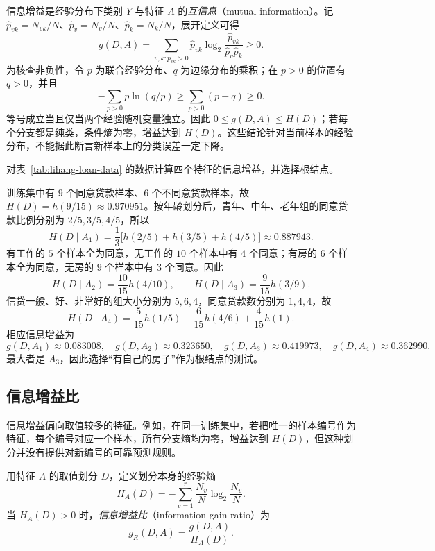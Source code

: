 信息增益是经验分布下类别 $Y$ 与特征 $A$ 的\emph{互信息}（mutual information）。记 $\widehat p_{vk}=N_{vk}/N$、$\widehat p_v=N_v/N$、$\widehat p_k=N_k/N$，展开定义可得
\begin{equation}
  g(D,A)=\sum_{v,k:\widehat p_{vk}>0}\widehat p_{vk}
  \log_2\frac{\widehat p_{vk}}{\widehat p_v\widehat p_k}\geq0.
  \label{eq:lihang-tree-mutual-information}
\end{equation}
为核查非负性，令 $p$ 为联合经验分布、$q$ 为边缘分布的乘积；在 $p>0$ 的位置有 $q>0$，并且
\[
  -\sum_{p>0}p\ln(q/p)\geq\sum_{p>0}(p-q)\geq0.
\]
等号成立当且仅当两个经验随机变量独立。因此 $0\leq g(D,A)\leq H(D)$；若每个分支都是纯类，条件熵为零，增益达到 $H(D)$。这些结论针对当前样本的经验分布，不能据此断言新样本上的分类误差一定下降。

\begin{example}
\label{ex:lihang-loan-gain}
对表~\ref{tab:lihang-loan-data} 的数据计算四个特征的信息增益，并选择根结点。
\end{example}
\begin{solve}
训练集中有 $9$ 个同意贷款样本、$6$ 个不同意贷款样本，故 $H(D)=h(9/15)\approx0.970951$。按年龄划分后，青年、中年、老年组的同意贷款比例分别为 $2/5,3/5,4/5$，所以
\[
  H(D\mid A_1)=\frac13\bigl[h(2/5)+h(3/5)+h(4/5)\bigr]\approx0.887943.
\]
有工作的 $5$ 个样本全为同意，无工作的 $10$ 个样本中有 $4$ 个同意；有房的 $6$ 个样本全为同意，无房的 $9$ 个样本中有 $3$ 个同意。因此
\[
  H(D\mid A_2)=\frac{10}{15}h(4/10),\qquad
  H(D\mid A_3)=\frac9{15}h(3/9).
\]
信贷一般、好、非常好的组大小分别为 $5,6,4$，同意贷款数分别为 $1,4,4$，故
\[
  H(D\mid A_4)=\frac5{15}h(1/5)+\frac6{15}h(4/6)+\frac4{15}h(1).
\]
相应信息增益为
\[
  g(D,A_1)\approx0.083008,\quad g(D,A_2)\approx0.323650,\quad
  g(D,A_3)\approx0.419973,\quad g(D,A_4)\approx0.362990.
\]
最大者是 $A_3$，因此选择“有自己的房子”作为根结点的测试。
\end{solve}

\subsection{信息增益比}

信息增益偏向取值较多的特征。例如，在同一训练集中，若把唯一的样本编号作为特征，每个编号对应一个样本，所有分支熵均为零，增益达到 $H(D)$，但这种划分并没有提供对新编号的可靠预测规则。

\begin{definition}[信息增益比]
用特征 $A$ 的取值划分 $D$，定义划分本身的经验熵
\[
  H_A(D)=-\sum_{v=1}^r\frac{N_v}{N}\log_2\frac{N_v}{N}.
\]
当 $H_A(D)>0$ 时，\emph{信息增益比}（information gain ratio）为
\begin{equation}
  g_R(D,A)=\frac{g(D,A)}{H_A(D)}.
  \label{eq:lihang-tree-gain-ratio}
\end{equation}
\end{definition}


